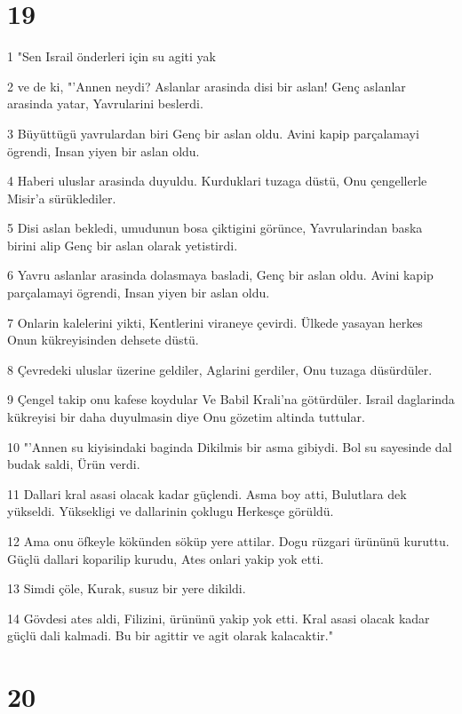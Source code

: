 \chapter{19}

\par 1 "Sen Israil önderleri için su agiti yak
\par 2 ve de ki, "'Annen neydi? Aslanlar arasinda disi bir aslan! Genç aslanlar arasinda yatar, Yavrularini beslerdi.
\par 3 Büyüttügü yavrulardan biri Genç bir aslan oldu. Avini kapip parçalamayi ögrendi, Insan yiyen bir aslan oldu.
\par 4 Haberi uluslar arasinda duyuldu. Kurduklari tuzaga düstü, Onu çengellerle Misir'a sürüklediler.
\par 5 Disi aslan bekledi, umudunun bosa çiktigini görünce, Yavrularindan baska birini alip Genç bir aslan olarak yetistirdi.
\par 6 Yavru aslanlar arasinda dolasmaya basladi, Genç bir aslan oldu. Avini kapip parçalamayi ögrendi, Insan yiyen bir aslan oldu.
\par 7 Onlarin kalelerini yikti, Kentlerini viraneye çevirdi. Ülkede yasayan herkes Onun kükreyisinden dehsete düstü.
\par 8 Çevredeki uluslar üzerine geldiler, Aglarini gerdiler, Onu tuzaga düsürdüler.
\par 9 Çengel takip onu kafese koydular Ve Babil Krali'na götürdüler. Israil daglarinda kükreyisi bir daha duyulmasin diye Onu gözetim altinda tuttular.
\par 10 "'Annen su kiyisindaki baginda Dikilmis bir asma gibiydi. Bol su sayesinde dal budak saldi, Ürün verdi.
\par 11 Dallari kral asasi olacak kadar güçlendi. Asma boy atti, Bulutlara dek yükseldi. Yüksekligi ve dallarinin çoklugu Herkesçe görüldü.
\par 12 Ama onu öfkeyle kökünden söküp yere attilar. Dogu rüzgari ürününü kuruttu. Güçlü dallari koparilip kurudu, Ates onlari yakip yok etti.
\par 13 Simdi çöle, Kurak, susuz bir yere dikildi.
\par 14 Gövdesi ates aldi, Filizini, ürününü yakip yok etti. Kral asasi olacak kadar güçlü dali kalmadi. Bu bir agittir ve agit olarak kalacaktir."

\chapter{20}


